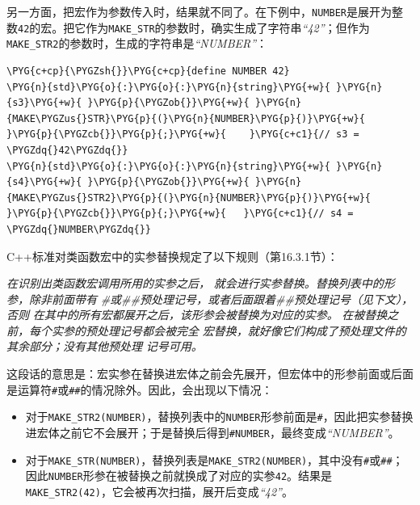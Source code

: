 
另一方面，把宏作为参数传入时，结果就不同了。在下例中，\texttt{NUMBER}是展开为整数\texttt{42}的宏。把它作为\texttt{MAKE\_\allowbreak{}STR}的参数时，确实生成了字符串\textit{“42”}；但作为\texttt{MAKE\_\allowbreak{}STR2}的参数时，生成的字符串是\textit{“NUMBER”}：



\begin{codeblockbg}
\begin{Verbatim}[commandchars=\\\{\},breaklines=true,breakanywhere=true,fontsize=\codefont,xleftmargin=17bp]
\PYG{c+cp}{\PYGZsh{}}\PYG{c+cp}{define NUMBER 42}
\PYG{n}{std}\PYG{o}{:}\PYG{o}{:}\PYG{n}{string}\PYG{+w}{ }\PYG{n}{s3}\PYG{+w}{ }\PYG{p}{\PYGZob{}}\PYG{+w}{ }\PYG{n}{MAKE\PYGZus{}STR}\PYG{p}{(}\PYG{n}{NUMBER}\PYG{p}{)}\PYG{+w}{ }\PYG{p}{\PYGZcb{}}\PYG{p}{;}\PYG{+w}{    }\PYG{c+c1}{// s3 = \PYGZdq{}42\PYGZdq{}}
\PYG{n}{std}\PYG{o}{:}\PYG{o}{:}\PYG{n}{string}\PYG{+w}{ }\PYG{n}{s4}\PYG{+w}{ }\PYG{p}{\PYGZob{}}\PYG{+w}{ }\PYG{n}{MAKE\PYGZus{}STR2}\PYG{p}{(}\PYG{n}{NUMBER}\PYG{p}{)}\PYG{+w}{ }\PYG{p}{\PYGZcb{}}\PYG{p}{;}\PYG{+w}{   }\PYG{c+c1}{// s4 = \PYGZdq{}NUMBER\PYGZdq{}}
\end{Verbatim}
\end{codeblockbg}



C++标准对类函数宏中的实参替换规定了以下规则（第16.3.1节）：



\textit{在识别出类函数宏调用所用的实参之后，} \textit{就会进行实参替换。替换列表中的形参，除非前面带有} \textit{\#或\#\#预处理记号，或者后面跟着\#\#预处理记号（见下文），否则} \textit{在其中的所有宏都展开之后，该形参会被替换为对应的实参。} \textit{在被替换之前，每个实参的预处理记号都会被完全} \textit{宏替换，就好像它们构成了预处理文件的其余部分；没有其他预处理} \textit{记号可用。}



这段话的意思是：宏实参在替换进宏体之前会先展开，但宏体中的形参前面或后面是运算符\texttt{\#}或\texttt{\#\#}的情况除外。因此，会出现以下情况：



\begin{itemize}
\item 对于\texttt{MAKE\_\allowbreak{}STR2(\allowbreak{}NUMBER)}，替换列表中的\texttt{NUMBER}形参前面是\texttt{\#}，因此把实参替换进宏体之前它不会展开；于是替换后得到\texttt{\#NUMBER}，最终变成\textit{“NUMBER”}。



\item 对于\texttt{MAKE\_\allowbreak{}STR(\allowbreak{}NUMBER)}，替换列表是\texttt{MAKE\_\allowbreak{}STR2(\allowbreak{}NUMBER)}，其中没有\texttt{\#}或\texttt{\#\#}；因此\texttt{NUMBER}形参在被替换之前就换成了对应的实参\texttt{42}。结果是\texttt{MAKE\_\allowbreak{}STR2(\allowbreak{}42)}，它会被再次扫描，展开后变成\textit{“42”}。

\end{itemize}


